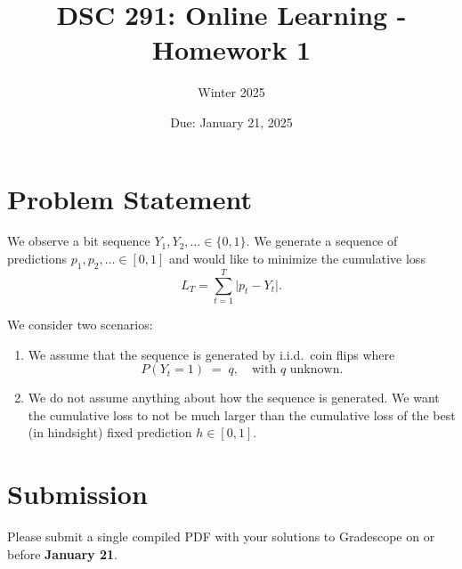 \documentclass[11pt]{article}
\title{DSC 291: Online Learning -  Homework 1}
\author{Winter 2025}
\date{Due: January 21, 2025}
\begin{document}
\maketitle

\section*{Problem Statement}

We observe a bit sequence $Y_1, Y_2, \ldots \in \{0,1\}.$ We generate a sequence of predictions 
\(
p_1, p_2, \ldots \in [0,1]
\)
and would like to minimize the cumulative loss 
\[
L_T = \sum_{t=1}^T \bigl| p_t - Y_t \bigr|.
\]

We consider two scenarios:

\begin{enumerate}
    \item We assume that the sequence is generated by i.i.d.\ coin flips where 
    \[
    P(Y_t = 1) \;=\; q, \quad \text{with } q \text{ unknown}.
    \]
    
    \item We do not assume anything about how the sequence is generated. We want the cumulative loss to
    not be much larger than the cumulative loss of the best (in hindsight) fixed prediction $h \in [0,1]$.
\end{enumerate}

\section*{Submission}
Please submit a single compiled PDF with your solutions to Gradescope on or before \textbf{January 21}.
\end{document}
